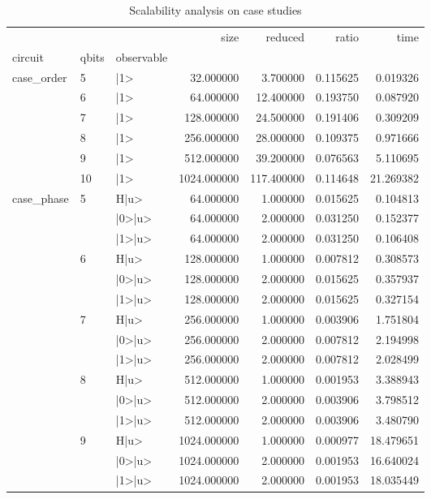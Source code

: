 \begin{table}
\caption{Scalability analysis on case studies}
\label{table:case_studies}
\begin{tabular}{lllrrrr}
\toprule
 &  &  & size & reduced & ratio & time \\
circuit & qbits & observable &  &  &  &  \\
\midrule
\multirow[c]{6}{*}{case_order} & 5 & |1> & 32.000000 & 3.700000 & 0.115625 & 0.019326 \\
 & 6 & |1> & 64.000000 & 12.400000 & 0.193750 & 0.087920 \\
 & 7 & |1> & 128.000000 & 24.500000 & 0.191406 & 0.309209 \\
 & 8 & |1> & 256.000000 & 28.000000 & 0.109375 & 0.971666 \\
 & 9 & |1> & 512.000000 & 39.200000 & 0.076563 & 5.110695 \\
 & 10 & |1> & 1024.000000 & 117.400000 & 0.114648 & 21.269382 \\
\multirow[c]{18}{*}{case_phase} & \multirow[c]{3}{*}{5} & H|u> & 64.000000 & 1.000000 & 0.015625 & 0.104813 \\
 &  & |0>|u> & 64.000000 & 2.000000 & 0.031250 & 0.152377 \\
 &  & |1>|u> & 64.000000 & 2.000000 & 0.031250 & 0.106408 \\
 & \multirow[c]{3}{*}{6} & H|u> & 128.000000 & 1.000000 & 0.007812 & 0.308573 \\
 &  & |0>|u> & 128.000000 & 2.000000 & 0.015625 & 0.357937 \\
 &  & |1>|u> & 128.000000 & 2.000000 & 0.015625 & 0.327154 \\
 & \multirow[c]{3}{*}{7} & H|u> & 256.000000 & 1.000000 & 0.003906 & 1.751804 \\
 &  & |0>|u> & 256.000000 & 2.000000 & 0.007812 & 2.194998 \\
 &  & |1>|u> & 256.000000 & 2.000000 & 0.007812 & 2.028499 \\
 & \multirow[c]{3}{*}{8} & H|u> & 512.000000 & 1.000000 & 0.001953 & 3.388943 \\
 &  & |0>|u> & 512.000000 & 2.000000 & 0.003906 & 3.798512 \\
 &  & |1>|u> & 512.000000 & 2.000000 & 0.003906 & 3.480790 \\
 & \multirow[c]{3}{*}{9} & H|u> & 1024.000000 & 1.000000 & 0.000977 & 18.479651 \\
 &  & |0>|u> & 1024.000000 & 2.000000 & 0.001953 & 16.640024 \\
 &  & |1>|u> & 1024.000000 & 2.000000 & 0.001953 & 18.035449 \\

\end{tabular}
\end{table}
